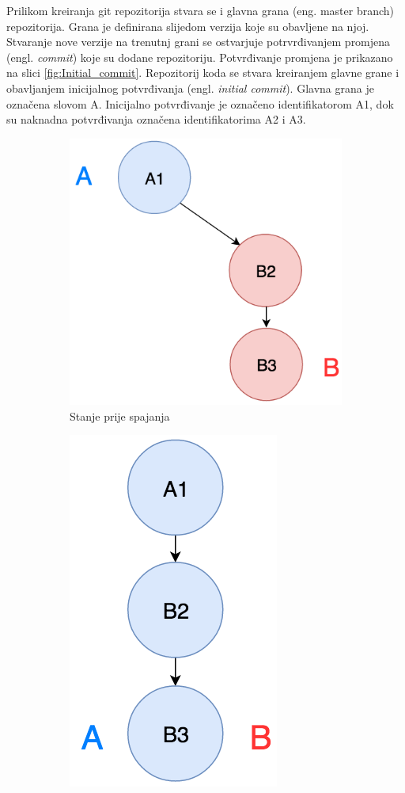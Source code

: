 \documentclass[times, utf8, diplomski, numeric]{fer}
\newcommand{\eng}[1]{(engl. \textit{#1})}
\begin{document}
Prilikom kreiranja git repozitorija stvara se i glavna grana (eng. master branch) repozitorija. Grana je definirana slijedom verzija koje su obavljene na njoj. Stvaranje nove verzije na trenutnj grani se ostvarjuje potrvrđivanjem promjena \eng{commit} koje su dodane repozitoriju. Potvrđivanje promjena je prikazano na slici \ref{fig:Initial_commit}. Repozitorij koda se stvara kreiranjem glavne grane i obavljanjem inicijalnog potvrđivanja \eng{initial commit}. Glavna grana je označena slovom A. Inicijalno potvrđivanje je označeno identifikatorom A1, dok su naknadna potvrđivanja označena identifikatorima A2 i A3.

\begin{figure}
\centering
\begin{subfigure}{.49\textwidth}
\centering
\includegraphics[scale=0.6]{FastForwardA}
\caption{Stanje prije spajanja}
\label{fig:FastForwardA}
\end{subfigure}
\begin{subfigure}{.49\textwidth}
\centering
\includegraphics[scale=0.6]{FastForwardB}

\end{subfigure}
\end{figure}
\end{document}
